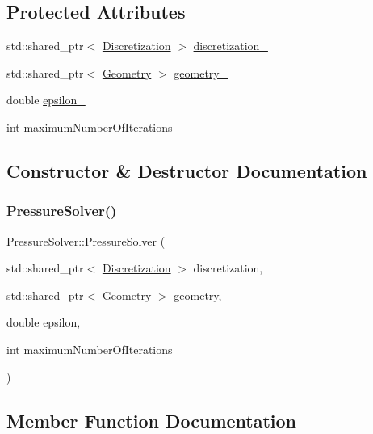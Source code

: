 \subsection*{Protected Attributes}
\begin{DoxyCompactItemize}
\item 
std\+::shared\+\_\+ptr$<$ \mbox{\hyperlink{classDiscretization}{Discretization}} $>$ \mbox{\hyperlink{classPressureSolver_af579ecebaaa8b11914293ef18af5fdc6}{discretization\+\_\+}}
\item 
std\+::shared\+\_\+ptr$<$ \mbox{\hyperlink{classGeometry}{Geometry}} $>$ \mbox{\hyperlink{classPressureSolver_af3df3def08159cc002f5f963f7e8be27}{geometry\+\_\+}}
\item 
double \mbox{\hyperlink{classPressureSolver_a22b723f3b3ba54e47f36cfc2b9576749}{epsilon\+\_\+}}
\item 
int \mbox{\hyperlink{classPressureSolver_af3b02d29bf1b21ad8b7e6edf8c2f4e87}{maximum\+Number\+Of\+Iterations\+\_\+}}
\end{DoxyCompactItemize}


\subsection{Constructor \& Destructor Documentation}
\mbox{\label{classPressureSolver_a0b18d1b4b728c717acb60e17d8afc2e9}} 
\subsubsection{\texorpdfstring{PressureSolver()}{PressureSolver()}}
{\footnotesize\ttfamily Pressure\+Solver\+::\+Pressure\+Solver (\begin{DoxyParamCaption}\item[{std\+::shared\+\_\+ptr$<$ \mbox{\hyperlink{classDiscretization}{Discretization}} $>$}]{discretization,  }\item[{std\+::shared\+\_\+ptr$<$ \mbox{\hyperlink{classGeometry}{Geometry}} $>$}]{geometry,  }\item[{double}]{epsilon,  }\item[{int}]{maximum\+Number\+Of\+Iterations }\end{DoxyParamCaption})}



\subsection{Member Function Documentation}
\mbox{\label{classPressureSolver_a458c383fcacaf54c1a333a271049ca93}} 
